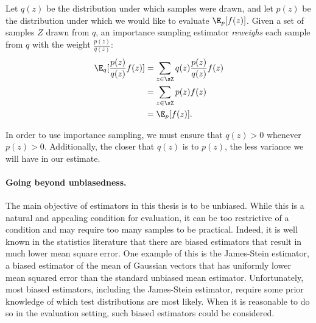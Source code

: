 Let $q(z)$ be the distribution under which samples were drawn, and let $p(z)$ be the distribution under which we would like to evaluate $\E_p[f(z)]$.
Given a set of samples $Z$ drawn from $q$, an importance sampling estimator \textit{reweighs} each sample from $q$ with the weight $\frac{p(z)}{q(z)}$:
\begin{align}
  \E_q[\frac{p(z)}{q(z)} f(z)] 
  &= \sum_{z \in \sZ} q(z) \frac{p(z)}{q(z)} f(z) \\
  &= \sum_{z \in \sZ} p(z) f(z) \\
  &= \E_p[f(z)].
\end{align}

In order to use importance sampling, we must ensure that $q(z) > 0$ whenever $p(z) > 0$.
Additionally, the closer that $q(z)$ is to $p(z)$, the less variance we will have in our estimate.

\paragraph{Going beyond unbiasedness.}
The main objective of estimators in this thesis is to be unbiased.
While this is a natural and appealing condition for evaluation, it can be too restrictive of a condition and may require too many samples to be practical.
Indeed, it is well known in the statistics literature that there are biased estimators that result in much lower mean square error.
One example of this is the James-Stein estimator, a biased estimator of the mean of Gaussian vectors that has uniformly lower mean squared error than the standard unbiased mean estimator.
Unfortunately, most biased estimators, including the James-Stein estimator, require some prior knowledge of which test distributions are most likely.
When it is reasonable to do so in the evaluation setting, such biased estimators could be considered.
